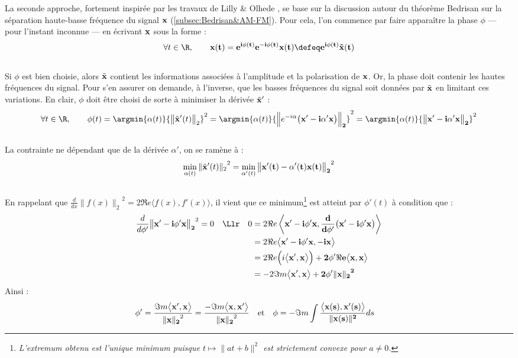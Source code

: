 La seconde approche, fortement inspirée par les travaux de Lilly \& Olhede  \cite{lilly_analysis_2012}, se base sur la discussion autour du théorème Bedrisan sur la séparation haute-basse fréquence du signal $\bf{x}$ (\cref{subsec:Bedrisan&AM-FM}). Pour cela, l'on commence par faire apparaître la phase $\phi$ --- pour l'instant inconnue --- en écrivant $\bf{x}$ sous la forme :
\[\forall t\in\R,\qquad \bf{x}(t) = e^{i\phi(t)} e^{-i\phi(t)} \bf{x}(t) \defeq e^{i\phi(t)} \Tilde{\bf{x}}(t)\]
\\
Si $\phi$ est bien choisie, alors $\Tilde{\bf{x}}$ contient les informations associées à l'amplitude et la polarisation de $\bf{x}$. Or, la phase doit contenir les hautes fréquences du signal. 
Pour s'en assurer on demande, à l'inverse, que les basses fréquences du signal soit données par $\Tilde{\bf{x}}$ en limitant ces variations. En clair, $\phi$ doit être choisi de sorte à minimiser la dérivée $\Tilde{\bf{x}}'$ :
\[\forall t\in\R,\qquad \phi(t) = \argmin{\alpha(t)}{\big\|\Tilde{\bf{x}}'(t)\big\|_2}^2 = \argmin{\alpha(t)}{\Big\|e^{-i\alpha}\big(\bf{x}' - i\alpha'\bf{x}\big)\Big\|_2}^2 = \argmin{\alpha(t)}{\big\|\bf{x}' - i\alpha'\bf{x}\big\|_2}^2\]
\\
La contrainte ne dépendant que de la dérivée $\alpha'$, on se ramène à :
\[\min_{\alpha(t)}{\|\Tilde{\bf{x}}'(t)\|_2}^2 = \min_{\alpha'(t)}{\big\|\bf{x}'(t) - \alpha'(t) \bf{x}(t)\big\|_2}^2\]
\\
En rappelant que $\frac{d}{dx}{\big\|f(x)\big\|_2}^2 = 2\Re e\big\langle f(x), f'(x)\big\rangle$, il vient que ce minimum\footnote{\itshape
	L'extremum obtenu est l'unique minimum puisque $t\longmapsto \|at + b\|^2$ est strictement convexe pour $a\neq0$.}
 est atteint par $\phi'(t)$ à condition que :
\begin{align*}
	\frac{d}{d\phi'}{\big\| \bf{x}' - i\phi' \bf{x}\big\|_2}^2 = 0 \quad \Llr\quad
		0 &= 2\Re e\left\langle  \bf{x}' - i\phi' \bf{x} ,  \frac{d}{d\phi'}\big(\bf{x}' - i\phi' \bf{x}\big)\right\rangle \\
		&= 2\Re e\big\langle  \bf{x}' - i\phi' \bf{x} ,  - i \bf{x}\big\rangle \\
		&= 2\Re e\Big(i\big\langle  \bf{x}' ,  \bf{x}\big\rangle\Big) + 2\phi'\Re e\big\langle   \bf{x} ,  \bf{x}\big\rangle\\
		&= -2\Im m\big\langle  \bf{x}' ,  \bf{x}\big\rangle + 2\phi'{\| \bf{x}\|_2}^2
\end{align*}
Ainsi :
\begin{align}\label{eq:phas_inst_v2}
	\phi' &= \frac{\Im m\big\langle  \bf{x}' ,  \bf{x}\big\rangle}{{\| \bf{x}\|_2}^2} = \frac{-\Im m\big\langle  \bf{x},  \bf{x}'\big\rangle}{{\| \bf{x}\|_2}^2}  &  &\text{et}  &  \phi &= -\Im m\int \frac{\big\langle \bf{x}(s) , \bf{x}'(s) \big\rangle}{\|\bf{x}(s)\|^2} ds
\end{align}

